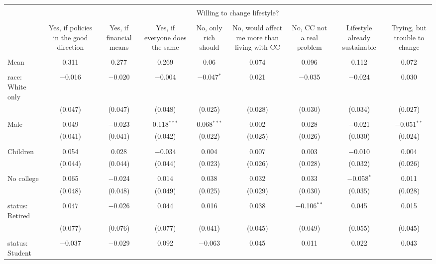 
\begin{tabular}{@{\extracolsep{5pt}}lcccccccc} 
\\[-1.8ex]\hline 
\hline \\[-1.8ex] 
 & \multicolumn{8}{c}{Willing to change lifestyle?} \\ 
\cline{2-9} 
\\[-1.8ex] & Yes, if policies in the good direction & Yes, if financial means & Yes, if everyone does the same & No, only rich should & No, would affect me more than living with CC & No, CC not a real problem & Lifestyle already sustainable & Trying, but trouble to change \\ 
\hline \\[-1.8ex] 
 Mean & 0.311 & 0.277 & 0.269 & 0.06 & 0.074 & 0.096 & 0.112 & 0.072  \\ \hline \\[-1.8ex] race: White only & $-$0.016 & $-$0.020 & $-$0.004 & $-$0.047$^{*}$ & 0.021 & $-$0.035 & $-$0.024 & 0.030 \\ 
  & (0.047) & (0.047) & (0.048) & (0.025) & (0.028) & (0.030) & (0.034) & (0.027) \\ 
  & & & & & & & & \\ 
 Male & 0.049 & $-$0.023 & 0.118$^{***}$ & 0.068$^{***}$ & 0.002 & 0.028 & $-$0.021 & $-$0.051$^{**}$ \\ 
  & (0.041) & (0.041) & (0.042) & (0.022) & (0.025) & (0.026) & (0.030) & (0.024) \\ 
  & & & & & & & & \\ 
 Children & 0.054 & 0.028 & $-$0.034 & 0.004 & 0.007 & 0.003 & $-$0.010 & 0.004 \\ 
  & (0.044) & (0.044) & (0.044) & (0.023) & (0.026) & (0.028) & (0.032) & (0.026) \\ 
  & & & & & & & & \\ 
 No college & 0.065 & $-$0.024 & 0.014 & 0.038 & 0.032 & 0.033 & $-$0.058$^{*}$ & 0.011 \\ 
  & (0.048) & (0.048) & (0.049) & (0.025) & (0.029) & (0.030) & (0.035) & (0.028) \\ 
  & & & & & & & & \\ 
 status: Retired & 0.047 & $-$0.026 & 0.044 & 0.016 & 0.038 & $-$0.106$^{**}$ & 0.045 & 0.015 \\ 
  & (0.077) & (0.076) & (0.077) & (0.041) & (0.045) & (0.049) & (0.055) & (0.045) \\ 
  & & & & & & & & \\ 
 status: Student & $-$0.037 & $-$0.029 & 0.092 & $-$0.063 & 0.045 & 0.011 & 0.022 & 0.043 \\ 

\end{tabular}
